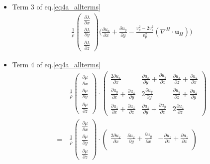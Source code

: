 \documentclass[]{article}
\begin{document}
	\begin{itemize}
		\item Term 3 of eq.\eqref{eq4a_allterms}
		\begin{align}
			\frac{1}{\rho}
			\begin{pmatrix}
				\frac{\partial \lambda}{\partial x}\\
				\frac{\partial \lambda}{\partial y}\\
				\frac{\partial \lambda}{\partial z}
			\end{pmatrix}
			\bigg(\frac{\partial u_{x}}{\partial x} + \frac{\partial u_{y}}{\partial y} - \frac{v_{p}^{2} - 2v_{s}^{2}}{v_{p}^{2}} (\nabla^{H} \cdot \bm{u}_{H}) \bigg) 
		\end{align}
		
		\item Term 4  of eq.\eqref{eq4a_allterms}
		\begin{align}
			&\frac{1}{\rho} 
			\begin{pmatrix}
				\frac{\partial \mu}{\partial x}\\
				\frac{\partial \mu}{\partial y}\\
				\frac{\partial \mu}{\partial z}
			\end{pmatrix}
			\cdot 
			\begin{pmatrix}
				\frac{2\partial u_{x}}{\partial x} & \frac{\partial u_{x}}{\partial y}  + \frac{\partial u_{y}}{\partial x}& \frac{\partial u_{x}}{\partial z} + \frac{\partial u_{z}}{\partial x}\\
				\frac{\partial u_{y}}{\partial x} + \frac{\partial u_{x}}{\partial y}& 2\frac{\partial u_{y}}{\partial y} & \frac{\partial u_{y}}{\partial z} + \frac{\partial u_{z}}{\partial y}\\
				\frac{\partial u_{z}}{\partial x} + \frac{\partial u_{x}}{\partial z}& \frac{\partial u_{z}}{\partial y} + \frac{\partial u_{y}}{\partial z}& 2\frac{\partial u_{z}}{\partial z}
			\end{pmatrix} \\
			= \:
			&\frac{1}{\rho} 
			\begin{pmatrix}
				\frac{\partial \mu}{\partial x}\\
				\frac{\partial \mu}{\partial y}\\
				\frac{\partial \mu}{\partial z}
			\end{pmatrix}
			\cdot 
			\begin{pmatrix}
				\frac{2\partial u_{x}}{\partial x} & \frac{\partial u_{x}}{\partial y}  + \frac{\partial u_{y}}{\partial x}& -\frac{\partial u_{z}}{\partial x} + \frac{\partial u_{z}}{\partial x}\\

\end{pmatrix}
\end{align}
\end{itemize}
\end{document}
